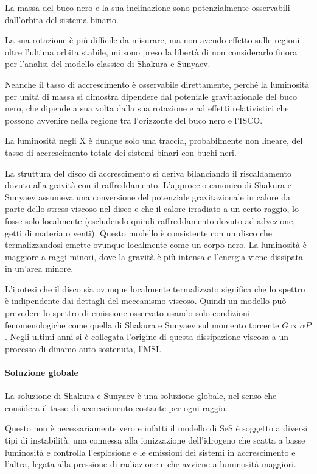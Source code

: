 \documentclass[a4paperbi]{article}
\begin{document}
	La massa del buco nero e la sua inclinazione sono potenzialmente osservabili dall'orbita del sistema binario.
	
	La sua rotazione è più difficile da misurare, ma non avendo effetto sulle regioni oltre l'ultima orbita stabile, mi sono preso la libertà di non considerarlo finora per l'analisi del modello classico di Shakura e Sunyaev.
	
	Neanche il tasso di accrescimento è osservabile direttamente, perché la luminosità per unità di massa si dimostra dipendere dal poteniale gravitazionale del buco nero, che dipende a sua volta dalla sua rotazione e ad effetti relativistici che possono avvenire nella regione tra l'orizzonte del buco nero e l'ISCO.
	
	La luminosità negli X è dunque solo una traccia, probabilmente non lineare, del tasso di accrescimento totale dei sistemi binari con buchi neri.
	
	La struttura del disco di accrescimento si deriva bilanciando il riscaldamento dovuto alla gravità con il raffreddamento. L'approccio canonico di Shakura e Sunyaev assumeva una conversione del potenziale gravitazionale in calore da parte dello stress viscoso nel disco e che il calore irradiato a un certo raggio, lo fosse solo localmente (escludendo quindi raffreddamento dovuto ad advezione, getti di materia o venti). Questo modello è consistente con un disco che termalizzandosi emette ovunque localmente come un corpo nero. La luminosità è maggiore a raggi minori, dove la gravità è più intensa e l'energia viene dissipata in un'area minore.
	
	L'ipotesi che il disco sia ovunque localmente termalizzato significa che lo spettro è indipendente dai dettagli del meccanismo viscoso. Quindi un modello può prevedere lo spettro di emissione osservato usando solo condizioni fenomenologiche come quella di Shakura e Sunyaev sul momento torcente $G\propto\alpha P$. Negli ultimi anni si è collegata l'origine di questa dissipazione viscosa a un processo di dinamo auto-sostenuta, l'MSI.
	
	\paragraph{Soluzione globale}
	La soluzione di Shakura e Sunyaev è una soluzione globale, nel senso che considera il tasso di accrescimento costante per ogni raggio.
	
	Questo non è necessariamente vero e infatti il modello di SeS è soggetto a diversi tipi di instabilità: una connessa alla ionizzazione dell'idrogeno che scatta a basse luminosità e controlla l'esplosione e le emissioni dei sistemi in accrescimento e l'altra, legata alla pressione di radiazione e che avviene a luminosità maggiori.
	
\end{document}
